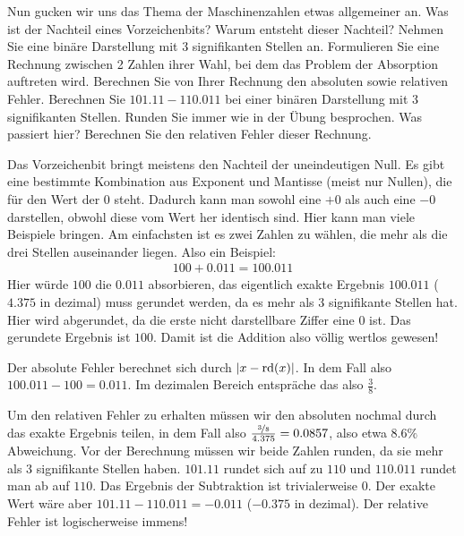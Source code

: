 \documentclass{scrartcl}
\begin{document}
	{
		Nun gucken wir uns das Thema der Maschinenzahlen etwas allgemeiner an.
	}{
		\itemf Was ist der Nachteil eines Vorzeichenbits? Warum entsteht dieser Nachteil?
		\itemf Nehmen Sie eine binäre Darstellung mit 3 signifikanten Stellen an. Formulieren Sie eine Rechnung zwischen 2 Zahlen ihrer Wahl, bei dem das Problem der Absorption auftreten wird. Berechnen Sie von Ihrer Rechnung den absoluten sowie relativen Fehler.
		\itemf Berechnen Sie $101.11 - 110.011$ bei einer binären Darstellung mit 3 signifikanten Stellen. Runden Sie immer wie in der Übung besprochen. Was passiert hier? Berechnen Sie den relativen Fehler dieser Rechnung.
	}{
		\itemf Das Vorzeichenbit bringt meistens den Nachteil der uneindeutigen Null. Es gibt eine bestimmte Kombination aus Exponent und Mantisse (meist nur Nullen), die für den Wert der $0$ steht. Dadurch kann man sowohl eine $+0$ als auch eine $-0$ darstellen, obwohl diese vom Wert her identisch sind.
		\itemf Hier kann man viele Beispiele bringen. Am einfachsten ist es zwei Zahlen zu wählen, die mehr als die drei Stellen auseinander liegen. Also ein Beispiel:
		\begin{align*}
			100 + 0.011 = 100.011
		\end{align*}
		Hier würde $100$ die $0.011$ absorbieren, das eigentlich exakte Ergebnis $100.011$ ($4.375$ in dezimal) muss gerundet werden, da es mehr als 3 signifikante Stellen hat. Hier wird abgerundet, da die erste nicht darstellbare Ziffer eine $0$ ist. Das gerundete Ergebnis ist $100$. Damit ist die Addition also völlig wertlos gewesen!
		
		Der absolute Fehler berechnet sich durch $\abs{x - \rd(x)}$. In dem Fall also $100.011 - 100 = 0.011$. Im dezimalen Bereich entspräche das also $\frac{3}{8}$.
		
		Um den relativen Fehler zu erhalten müssen wir den absoluten nochmal durch das exakte Ergebnis teilen, in dem Fall also $\frac{\nicefrac{3}{8}}{4.375} = 0.0857$, also etwa $8.6\%$ Abweichung.
		\itemf Vor der Berechnung müssen wir beide Zahlen runden, da sie mehr als 3 signifikante Stellen haben. $101.11$ rundet sich auf zu $110$ und $110.011$ rundet man ab auf $110$. Das Ergebnis der Subtraktion ist trivialerweise $0$. Der exakte Wert wäre aber $101.11 - 110.011 = -0.011$ ($-0.375$ in dezimal). Der relative Fehler ist logischerweise immens!
	}
\end{document}
